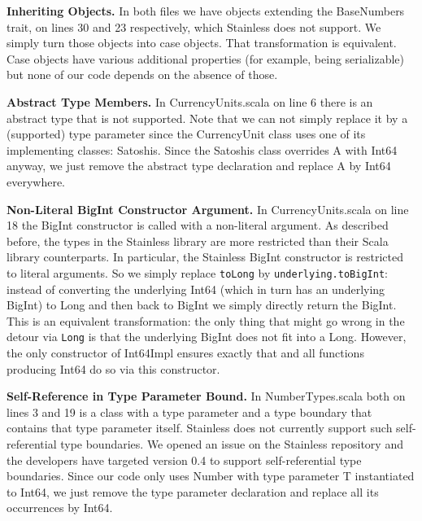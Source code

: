 \documentclass[runningheads]{llncs}
\renewcommand{\paragraph}{\textbf}%
\begin{document}
\paragraph{Inheriting Objects.} In both files we have objects
extending the BaseNumbers trait, on lines 30 and 23 respectively,
which Stainless does not support. We simply turn those objects into
case objects. That transformation is equivalent. Case objects have
various additional properties (for example, being serializable) but
none of our code depends on the absence of those.

\paragraph{Abstract Type Members.} In CurrencyUnits.scala on line 6
there is an abstract type that is not supported. Note that we can not
simply replace it by a (supported) type parameter since the
CurrencyUnit class uses one of its implementing classes:
Satoshis. Since the Satoshis class overrides A with Int64 anyway, we
just remove the abstract type declaration and replace A by Int64
everywhere.

\paragraph{Non-Literal BigInt Constructor Argument.} In
CurrencyUnits.scala on line 18 the BigInt constructor is called with a
non-literal argument. As described before, the types in the Stainless
library are more restricted than their Scala library counterparts. In
particular, the Stainless BigInt constructor is restricted to literal
arguments. So we simply replace \texttt{toLong} by
\texttt{underlying.toBigInt}: instead of converting the underlying
Int64 (which in turn has an underlying BigInt) to Long and then back
to BigInt we simply directly return the BigInt. This is an equivalent
transformation: the only thing that might go wrong in the detour via
\texttt{Long} is that the underlying BigInt does not fit into a
Long. However, the only constructor of Int64Impl ensures exactly that
and all functions producing Int64 do so via this constructor.

\paragraph{Self-Reference in Type Parameter Bound.} In
NumberTypes.scala both on lines 3 and 19 is a class with a type
parameter and a type boundary that contains that type parameter
itself. Stainless does not currently support such self-referential
type boundaries. We opened an issue \cite{Stainless:issue519} on the
Stainless repository and the developers have targeted version 0.4 to
support self-referential type boundaries. Since our code only uses
Number with type parameter T instantiated to Int64, we just remove the
type parameter declaration and replace all its occurrences by Int64.
\end{document}
